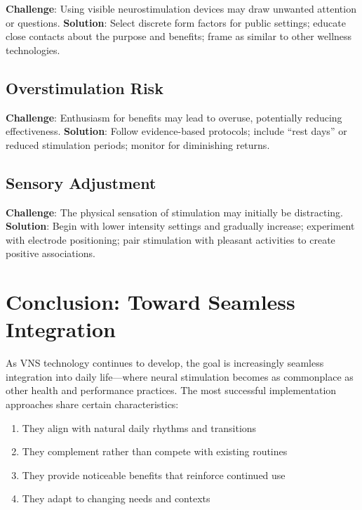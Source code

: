 \documentclass[
  Letterpaper,
]{scrbook}
\providecommand{\tightlist}{%
  \setlength{\itemsep}{0pt}\setlength{\parskip}{0pt}}\usepackage{longtable,booktabs,array}
\begin{document}
\textbf{Challenge}: Using visible neurostimulation devices may draw
unwanted attention or questions. \textbf{Solution}: Select discrete form
factors for public settings; educate close contacts about the purpose
and benefits; frame as similar to other wellness technologies.

\subsection{Overstimulation Risk}\label{overstimulation-risk}

\textbf{Challenge}: Enthusiasm for benefits may lead to overuse,
potentially reducing effectiveness. \textbf{Solution}: Follow
evidence-based protocols; include ``rest days'' or reduced stimulation
periods; monitor for diminishing returns.

\subsection{Sensory Adjustment}\label{sensory-adjustment}

\textbf{Challenge}: The physical sensation of stimulation may initially
be distracting. \textbf{Solution}: Begin with lower intensity settings
and gradually increase; experiment with electrode positioning; pair
stimulation with pleasant activities to create positive associations.

\section{Conclusion: Toward Seamless
Integration}\label{conclusion-toward-seamless-integration}

As VNS technology continues to develop, the goal is increasingly
seamless integration into daily life---where neural stimulation becomes
as commonplace as other health and performance practices. The most
successful implementation approaches share certain characteristics:

\begin{enumerate}
\def\labelenumi{\arabic{enumi}.}
\tightlist
\item
  They align with natural daily rhythms and transitions
\item
  They complement rather than compete with existing routines
\item
  They provide noticeable benefits that reinforce continued use
\item
  They adapt to changing needs and contexts
\end{enumerate}
\end{document}
